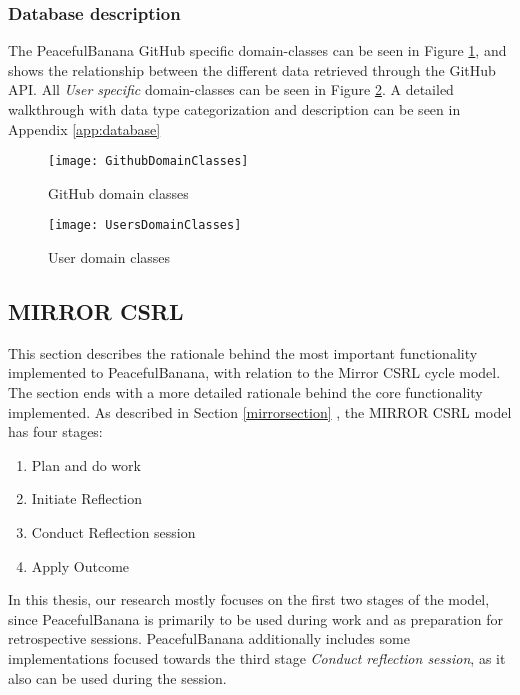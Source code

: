 \subsubsection{Database description}
The PeacefulBanana GitHub specific domain-classes can be seen in Figure \ref{GithubDomainClasses}, and shows the relationship between the different data retrieved through the GitHub API.
All \emph{User specific} domain-classes can be seen in Figure \ref{UsersDomainClasses}.
A detailed walkthrough with data type categorization and description can be seen in Appendix \ref{app:database}
\begin{figure}[H]
    \centering
        \texttt{[image: GithubDomainClasses]}
    \caption{GitHub domain classes}
    \label{GithubDomainClasses}
\end{figure}
\begin{figure}[H]
    \centering
        \texttt{[image: UsersDomainClasses]}
    \caption{User domain classes}
    \label{UsersDomainClasses}
\end{figure}

\subsection{MIRROR CSRL}
This section describes the rationale behind the most important functionality implemented to PeacefulBanana, with relation to the Mirror CSRL cycle model. The section ends with a more detailed rationale behind the core functionality implemented. As described in Section \ref{mirrorsection} , the MIRROR CSRL model has four stages: 
\begin{enumerate}
    \item Plan and do work
    \item Initiate Reflection
    \item Conduct Reflection session
    \item Apply Outcome
\end{enumerate}
In this thesis, our research mostly focuses on the first two stages of the model, since PeacefulBanana is primarily to be used during work and as preparation for retrospective sessions. PeacefulBanana additionally includes some implementations focused towards the third stage \emph{Conduct reflection session}, as it also can be used during the session. 

